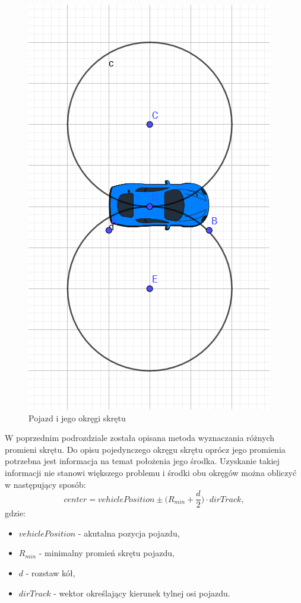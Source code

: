 \documentclass[a4paper,11pt,twoside]{report}
\theoremstyle{definition}
\begin{document}
\begin{figure}[h!]
\centering
\includegraphics[scale=0.55]{vehicleWithTurningCircles}
\caption[Pojazd i jego okręgi skrętu]{Pojazd i jego okręgi skrętu}
\end{figure}

W poprzednim podrozdziale została opisana metoda wyznaczania różnych promieni skrętu. Do opisu pojedynczego okręgu skrętu oprócz jego promienia potrzebna jest informacja na temat położenia jego środka. Uzyskanie takiej informacji nie stanowi większego problemu i środki obu okręgów można obliczyć w następujący sposób:
$$
center = vehiclePosition \pm \Big(R_{min} + \frac{d}{2}\Big) \cdot dirTrack,
$$
gdzie: 
\begin{itemize}
	\item $vehiclePosition$ - akutalna pozycja pojazdu,
	\item $R_{min}$ - minimalny promień skrętu pojazdu,
	\item $d$ - rozstaw kół,
	\item $dirTrack$ - wektor określający kierunek tylnej osi pojazdu.
\end{itemize}
\end{document}
